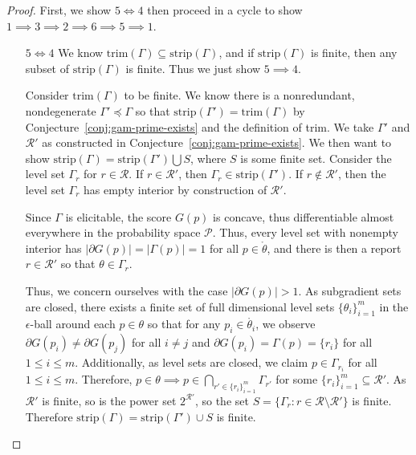 \documentclass[12pt]{article}
\newcommand{\Comments}{1}
\newcommand{\mynote}[2]{\ifnum\Comments=1\textcolor{#1}{#2}\fi}
\newcommand{\jessie}[1]{\mynote{purple}{[JF: #1]}}
\renewcommand{\P}{\mathcal{P}}
\newcommand{\R}{\mathcal{R}}
\newcommand{\inter}[1]{\mathring{#1}}%
\newcommand{\trim}{\mathrm{trim}}
\newcommand{\strip}{\mathrm{strip}}
\begin{document}
\begin{proof}
First, we show $5 \iff 4$ then proceed in a cycle to show $1 \implies 3 \implies 2 \implies 6 \implies 5 \implies 1$.

\begin{enumerate}
	
	\item[$5 \iff 4$] 
	We know $\trim(\Gamma) \subseteq \strip(\Gamma)$, and if $\strip(\Gamma)$ is finite, then any subset of $\strip(\Gamma)$ is finite.
	Thus we just show $5 \implies 4$.
	
	Consider $\trim(\Gamma)$ to be finite.
	We know there is a nonredundant, nondegenerate $\Gamma' \preceq \Gamma$ so that $\strip(\Gamma') = \trim(\Gamma)$ by Conjecture~\ref{conj:gam-prime-exists} and the definition of trim.
	We take $\Gamma'$ and $\R'$ as constructed in Conjecture~\ref{conj:gam-prime-exists}.
	We then want to show $\strip(\Gamma) = \strip(\Gamma') \bigcup S$, where $S$ is some finite set.
	Consider the level set $\Gamma_r$ for $r \in \R$.
	If $r \in \R'$, then $\Gamma_r \in \strip(\Gamma')$.
	If $r \not \in \R'$, then the level set $\Gamma_r$ has empty interior by construction of $\R'$.
	
	Since $\Gamma$ is elicitable, the score $G(p)$ is concave, thus differentiable almost everywhere in the probability space $\P$.
	Thus, every level set with nonempty interior has $|\partial G(p)| = |\Gamma(p)| = 1$ for all $p \in \inter{\theta}$, and there is then a report $r \in \R'$ so that $\theta \in \Gamma_r$.
	
	Thus, we concern ourselves with the case $|\partial G(p)| > 1$.
	As subgradient sets are closed, there exists a finite set of full dimensional level sets $\{\theta_i\}_{i=1}^m$ in the $\epsilon$-ball around each $p \in \theta$ so that for any $p_i \in \inter{\theta_i}$, we observe $\partial G(p_i) \neq \partial G(p_j)$ for all $i \neq j$ and $\partial G(p_i) = \Gamma(p) = \{r_i\}$ for all $1 \leq i \leq m$.
	Additionally, as level sets are closed, we claim $p \in \Gamma_{r_i}$ for all $1 \leq i \leq m$.
	Therefore, $p \in \theta \implies p \in \bigcap_{r' \in \{r_i\}_{i=1}^m} \Gamma_{r'}$ for some $\{r_i\}_{i=1}^m \subseteq \R'$.
	As $\R'$ is finite, so is the power set $2^{\R'}$, so the set $S = \{\Gamma_r : r \in \R \setminus \R' \}$ is finite.
	Therefore $\strip(\Gamma) = \strip(\Gamma') \cup S$ is finite. 
	

\end{enumerate}
\end{proof}
\end{document}
